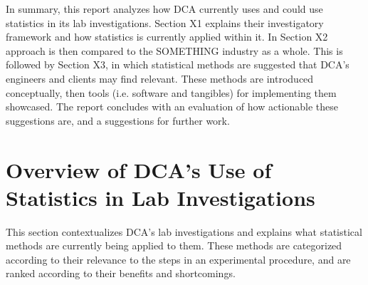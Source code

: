 \documentclass[11pt,a4paper,article]{memoir} %
\begin{document}
\par
In summary, this report analyzes how DCA currently uses and could use statistics in its lab investigations. Section X1 explains their investigatory framework and how statistics is currently applied within it. In Section X2 approach is then compared to the SOMETHING industry as a whole. This is followed by Section X3, in which statistical methods are suggested that DCA's engineers and clients may find relevant. These methods are introduced conceptually, then tools (i.e. software and tangibles) for implementing them showcased. The report concludes with an evaluation of how actionable these suggestions are, and a suggestions for further work.

\newpage



\chapter {Overview of DCA's Use of Statistics in Lab Investigations}
This section contextualizes DCA's lab investigations and explains what statistical methods are currently being applied to them. These methods are categorized according to their relevance to the steps in an experimental procedure, and are ranked according to their benefits and shortcomings. 
\end{document}
